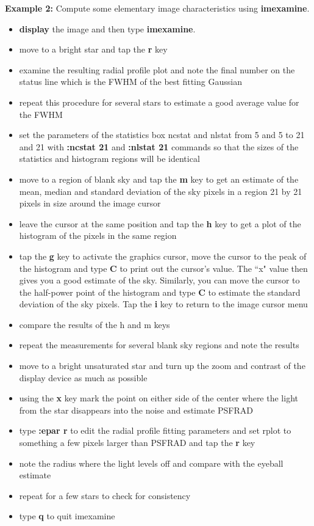 {\bf Example 2:} Compute some elementary image characteristics using
{\bf imexamine}.
 
\begin{itemize}
\item {\bf display} the image and then type {\bf imexamine}.
\item move to a bright star and tap the {\bf  r} key
\item examine the resulting radial profile plot and note the final
number on the status line which is the FWHM of the best fitting
Gaussian
\item repeat this procedure for several stars to estimate a good
average value for the FWHM
\item set the parameters of the statistics box ncstat and nlstat
from 5 and 5 to 21 and 21 with  {\bf :ncstat 21} and {\bf :nlstat 21}
commands so that the sizes of the statistics and histogram
regions will be identical
\item  move to a region of blank sky and tap the {\bf m} key to get an
estimate of the mean, median and standard deviation of the
sky pixels in a region 21 by 21 pixels in size around the
image cursor
\item leave the cursor at the same position and tap the {\bf h} key to
get a plot of the histogram of the pixels in the same region
\item tap the {\bf g} key to activate the graphics cursor, move the
cursor to the peak of the histogram and type {\bf C} to print out
the cursor's value.  The ``x" value then gives you a good estimate of
the sky.  Similarly, you can move the cursor to the
half-power point of
the histogram and type {\bf C} to estimate the standard deviation
of the sky pixels.  Tap the {\bf i} key to return to the
image cursor menu
\item compare the results of the h and m keys
\item repeat the measurements for several blank sky regions and note
the results
\item move to a bright unsaturated star and turn up the zoom and
 contrast of the display device as much as possible
\item using the {\bf x} key mark the point on either side of the center
where the light from the star disappears into the noise
and estimate PSFRAD 
\item type {\bf :epar r} to edit the radial profile fitting parameters
and set rplot to something a few pixels larger than PSFRAD
and tap the {\bf r} key
\item note the radius where the light levels off and compare with
the eyeball estimate
\item repeat for a few stars to check for consistency
\item type {\bf q} to quit imexamine
\end{itemize}
 
